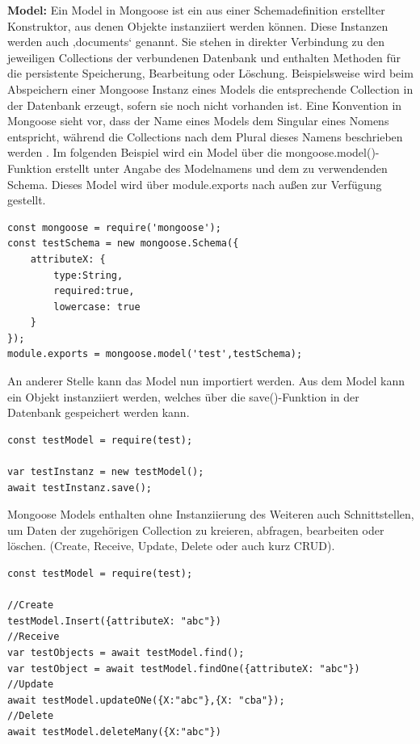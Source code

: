 \newpage
\noindent
\textbf{Model:}
Ein Model in Mongoose ist ein aus einer Schemadefinition erstellter Konstruktor, aus denen Objekte instanziiert werden können. Diese Instanzen werden auch ‚documents‘ genannt. Sie stehen in direkter Verbindung zu den jeweiligen Collections der verbundenen Datenbank und enthalten Methoden für die persistente Speicherung, Bearbeitung oder Löschung. Beispielsweise wird beim Abspeichern einer Mongoose Instanz eines Models die entsprechende Collection in der Datenbank erzeugt, sofern sie noch nicht vorhanden ist. Eine Konvention in Mongoose sieht vor, dass der Name eines Models dem Singular eines Nomens entspricht, während die Collections nach dem Plural dieses Namens beschrieben werden \cite{Node3.2}. Im folgenden Beispiel wird ein Model über die mongoose.model()-Funktion erstellt unter Angabe des Modelnamens und dem zu verwendenden Schema. Dieses Model wird über module.exports nach außen zur Verfügung gestellt.\\

\begin{lstlisting}[caption=Model erstellen und exportierenn,label=lst:MongooseObjectExport]
const mongoose = require('mongoose');
const testSchema = new mongoose.Schema({
	attributeX: {
		type:String,
		required:true,
		lowercase: true
	}
});
module.exports = mongoose.model('test',testSchema);
\end{lstlisting}

\noindent
An anderer Stelle kann das Model nun importiert werden. Aus dem Model kann ein Objekt instanziiert werden, welches über die save()-Funktion in der Datenbank gespeichert werden kann.\\

\begin{lstlisting}[caption=Model importieren - Objekt instanziieren und persistent speichern,label=lst:MongooseObjectInstance]
const testModel = require(test);

var testInstanz = new testModel();
await testInstanz.save();
\end{lstlisting}

\noindent
Mongoose Models enthalten ohne Instanziierung des Weiteren auch Schnittstellen, um Daten der zugehörigen Collection zu kreieren, abfragen, bearbeiten oder löschen. (Create, Receive, Update, Delete oder auch kurz CRUD).
\newline

\begin{lstlisting}[caption=CRUD-Beispielfunktionen eines Mongoose-Models,label=lst:MongooseCrud]
const testModel = require(test);

//Create
testModel.Insert({attributeX: "abc"})
//Receive
var testObjects = await testModel.find();
var testObject = await testModel.findOne({attributeX: "abc"})
//Update
await testModel.updateONe({X:"abc"},{X: "cba"});
//Delete
await testModel.deleteMany({X:"abc"})
\end{lstlisting}

